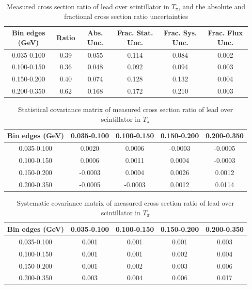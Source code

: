 \documentclass[../main.tex]{subfiles}
\begin{document}
\begin{table}
  \centering
  \renewcommand{\arraystretch}{1.15}
  \caption{Measured cross section ratio of lead over scintillator in $T_{\pi}$, and the absolute and fractional cross section ratio uncertainties}
    \begin{tabular}{c||c|c||c|c|c}
      Bin edges (GeV) &  Ratio  &  Abs. Unc.  &  Frac. Stat. Unc.  &  Frac. Sys. Unc.  &  Frac. Flux Unc. \\
      \hline
      \hline
      0.035-0.100 & 0.39 & 0.055 & 0.114 & 0.084 & 0.002\\
      0.100-0.150 & 0.36 & 0.048 & 0.092 & 0.094 & 0.003\\
      0.150-0.200 & 0.40 & 0.074 & 0.128 & 0.132 & 0.004\\
      0.200-0.350 & 0.62 & 0.168 & 0.172 & 0.210 & 0.003
    \end{tabular}
  \label{tbl:rationucleonnuc82pion_ekina}
\end{table}
\begin{table}
  \centering
  \renewcommand{\arraystretch}{1.15}
  \caption{Statistical covariance matrix of measured cross section ratio of lead over scintillator in $T_{\pi}$}
    \begin{tabular}{c||cccc}
      Bin edges (GeV) & 0.035-0.100 & 0.100-0.150 & 0.150-0.200 & 0.200-0.350\\
      \hline
      \hline
      0.035-0.100 & 0.0020 & 0.0006 & -0.0003 & -0.0005\\
      0.100-0.150 & 0.0006 & 0.0011 & 0.0004 & -0.0003\\
      0.150-0.200 & -0.0003 & 0.0004 & 0.0026 & 0.0012\\
      0.200-0.350 & -0.0005 & -0.0003 & 0.0012 & 0.0114
    \end{tabular}
  \label{tbl:rationucleonnuc82pion_ekinb}
\end{table}
\begin{table}
  \centering
  \renewcommand{\arraystretch}{1.15}
  \caption{Systematic covariance matrix of measured cross section ratio of lead over scintillator in $T_{\pi}$}
    \begin{tabular}{c||cccc}
      Bin edges (GeV) & 0.035-0.100 & 0.100-0.150 & 0.150-0.200 & 0.200-0.350\\
      \hline
      \hline
      0.035-0.100 & 0.001 & 0.001 & 0.001 & 0.003\\
      0.100-0.150 & 0.001 & 0.001 & 0.002 & 0.004\\
      0.150-0.200 & 0.001 & 0.002 & 0.003 & 0.006\\
      0.200-0.350 & 0.003 & 0.004 & 0.006 & 0.017
    \end{tabular}
  \label{tbl:rationucleonnuc82pion_ekinc}
\end{table}
\end{document}
